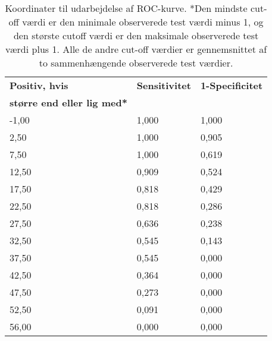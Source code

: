 \begin{table}[H]
\caption{Koordinater til udarbejdelse af ROC-kurve. 
\scriptsize{*Den mindste cut-off værdi er den minimale observerede test værdi minus 1, og den største cutoff værdi er den maksimale observerede test værdi plus 1. Alle de andre cut-off værdier er gennemsnittet af to sammenhængende observerede test værdier.}}
\vspace{2mm}
\label{table:app_ROC}
\centering
\begin{tabular}{|p{3cm}|p{2.5cm}|p{2.5cm}|}
\rowcolor[HTML]{C0C0C0}\textbf{Positiv, hvis} & \textbf{Sensitivitet} & \textbf{1-Specificitet} \\ 
\rowcolor[HTML]{C0C0C0} \textbf{større end eller lig med*} &  &    \\ \hline
-1,00 & 1,000 & 1,000 \\ \hline
2,50	& 1,000 & 0,905 \\ \hline
7,50 & 1,000 & 0,619 \\ \hline
12,50  & 0,909 & 0,524 \\ \hline
17,50 & 0,818 & 0,429 \\ \hline
22,50  & 0,818 & 0,286 \\ \hline
27,50  & 0,636 & 0,238 \\ \hline
32,50  & 0,545 & 0,143 \\ \hline
37,50  & 0,545 & 0,000 \\ \hline
42,50  & 0,364 & 0,000 \\ \hline
47,50 & 0,273 & 0,000 \\ \hline
52,50 & 0,091 & 0,000 \\ \hline
56,00 & 0,000 & 0,000  \\ \hline
\end{tabular}
\end{table}

